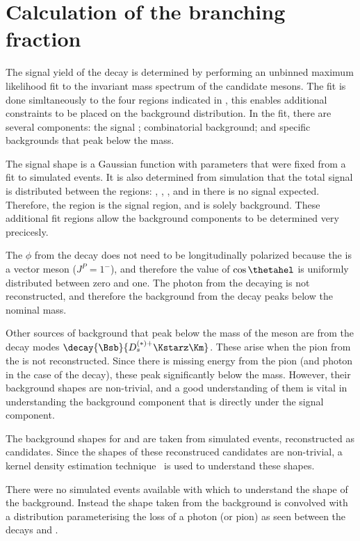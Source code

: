 \section{Calculation of the branching fraction}

The signal yield of the decay \btodsphi is determined by performing an unbinned maximum likelihood
fit to the invariant mass spectrum of the candidate \Bp mesons.
The fit is done simltaneously to the four regions indicated in , this enables
additional constraints to be placed on the background distribution.
In the fit, there are several components: the signal \btodsphi; combinatorial background; and
specific backgrounds that peak below the \Bp mass.

The signal shape is a Gaussian function with parameters that were fixed from a fit to simulated
events.
It is also determined from simulation that the total signal is distributed between the regions:
\pc, \pc, \pc, and in \rD there is no signal expected.
Therefore, the region \rA is the signal region, and \rD is solely background.
These additional fit regions allow the background components to be determined very precicesly.

The $\phi$ from the decay \btodsstrphi does not need to be longitudinally polarized because the
\Dssp is a vector meson ($J^P=1^-$), and therefore the value of $\cos\thetahel$ is uniformly
distributed between zero and one.
The photon from the decaying \Dssp is not reconstructed, and therefore the background from the
decay \btodsstrphi peaks below the nominal \Bp mass.

Other sources of background that peak below the mass of the \Bp meson are from the decay modes
$\decay{\Bsb}{D_s^{(*)+}\Kstarz\Km}$.
These arise when the pion from the \decay{\Kstarz}{\Kp\pim} is not reconstructed.
Since there is missing energy from the pion (and photon in the case of the \Dssp decay), these peak
significantly below the \Bp mass.
However, their background shapes are non-trivial, and a good understanding of them is vital in
understanding the background component that is directly under the signal component.

The background shapes for \btodsstrphi and \bstodskstrk are taken from simulated events,
reconstructed as \btodsphi candidates.
Since the shapes of these reconstruced candidates are non-trivial, a kernel density estimation
technique~\cite{Cranmer:2000du} is used to understand these shapes.

There were no simulated events available with which to understand the shape of the \bstodsstrkstrk
background.
Instead the shape taken from the \bstodskstrk background is convolved with a distribution
parameterising the loss of a photon (or pion) as seen between the decays \btodsstrphi and
\bstodskstrk.

